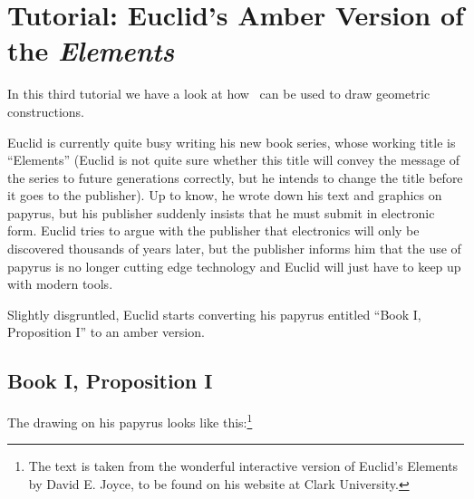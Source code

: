 %
%
%


\section{Tutorial: Euclid's Amber Version of the \emph{Elements}}

In this third tutorial we have a look at how \tikzname\ can be used to
draw geometric constructions.

Euclid is currently quite busy writing his new book series, whose
working title is ``Elements'' (Euclid is not quite sure whether this
title will convey the message of the series to future generations
correctly, but he intends to change the title before it goes to the
publisher). Up to know, he wrote down his text and graphics on
papyrus, but his publisher suddenly insists that he must submit in
electronic form. Euclid tries to argue with the publisher that 
electronics will only be discovered thousands of years later, but the
publisher informs him that the use of papyrus is no longer cutting edge
technology and Euclid will just have to keep up with modern tools.

Slightly disgruntled, Euclid starts converting his papyrus
entitled ``Book I, Proposition I'' to an amber version.  

\subsection{Book I, Proposition I}

The drawing on his papyrus looks like this:\footnote{The text is taken
from the wonderful interactive version of Euclid's Elements by David
E. Joyce, to be found on his website at Clark University.}

